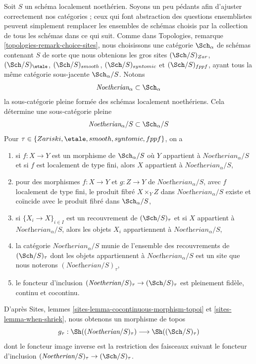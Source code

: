 \medskip\noindent
Soit $S$ un schéma localement noethérien. Soyons un peu pédants afin
d'ajuster correctement nos catégories ; ceux qui font abstraction des questions
ensemblistes peuvent simplement remplacer les ensembles de schémas choisis par la collection
de tous les schémas dans ce qui suit. Comme dans
Topologies, remarque \ref{topologies-remark-choice-sites},
nous choisissons une catégorie $\Sch_\alpha$ de schémas contenant
$S$ de sorte que nous obtenions les gros sites $(\Sch/S)_{Zar}$,
$(\Sch/S)_\etale$, $(\Sch/S)_{smooth}$, $(\Sch/S)_{syntomic}$
et $(\Sch/S)_{fppf}$, ayant tous la même
catégorie sous-jacente $\Sch_\alpha/S$. Notons
$$
\textit{Noetherian}_\alpha \subset \Sch_\alpha
$$
la sous-catégorie pleine formée des schémas localement noethériens.
Cela détermine une sous-catégorie pleine
$$
\textit{Noetherian}_\alpha/S \subset \Sch_\alpha/S
$$
Pour $\tau \in \{Zariski, \etale, smooth, syntomic, fppf\}$, on a
\begin{enumerate}
\item si $f : X \to Y$ est un morphisme de $\Sch_\alpha/S$
où $Y$ appartient à $\textit{Noetherian}_\alpha/S$ et si
$f$ est localement de type fini, alors $X$ appartient à $\textit{Noetherian}_\alpha/S$,
\item pour des morphismes $f : X \to Y$ et $g : Z \to Y$ de
$\textit{Noetherian}_\alpha/S$, avec $f$ localement de type fini,
le produit fibré $X \times_Y Z$ dans $\textit{Noetherian}_\alpha/S$
existe et coïncide avec le produit fibré dans $\Sch_\alpha/S$,
\item si $\{X_i \to X\}_{i \in I}$ est un recouvrement de
$(\Sch/S)_\tau$ et si $X$ appartient à $\textit{Noetherian}_\alpha/S$,
alors les objets $X_i$ appartiennent à $\textit{Noetherian}_\alpha/S$,
\item la catégorie $\textit{Noetherian}_\alpha/S$ munie
de l'ensemble des recouvrements de $(\Sch/S)_\tau$ dont les objets
appartiennent à $\textit{Noetherian}_\alpha/S$ est un site
que nous noterons $(\textit{Noetherian}/S)_\tau$,
\item le foncteur d'inclusion
$(\textit{Noetherian}/S)_\tau \to (\Sch/S)_\tau$
est pleinement fidèle, continu et cocontinu.
\end{enumerate}
D'après Sites, lemmes \ref{sites-lemma-cocontinuous-morphism-topoi} et
\ref{sites-lemma-when-shriek}, nous obtenons un morphisme de topos
$$
g_\tau : \Sh((\textit{Noetherian}/S)_\tau) \longrightarrow \Sh((\Sch/S)_\tau)
$$
dont le foncteur image inverse est la restriction des faisceaux suivant
le foncteur d'inclusion $(\textit{Noetherian}/S)_\tau \to (\Sch/S)_\tau$.

